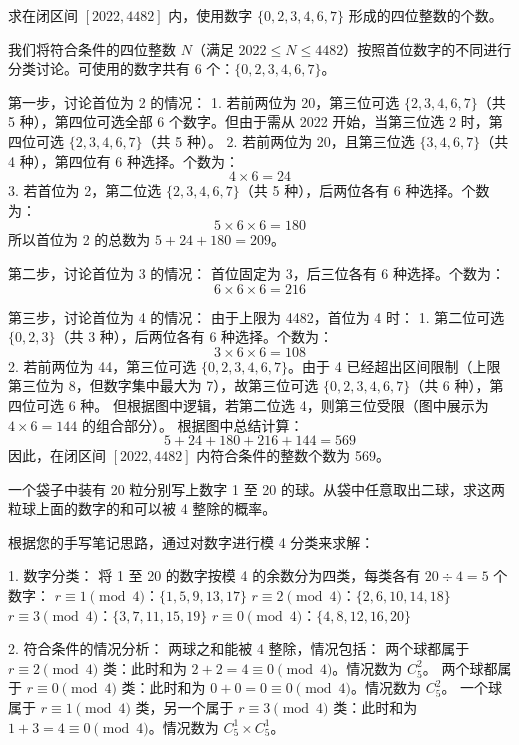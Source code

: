 \begin{questions}
    \question
求在闭区间 $[2022, 4482]$ 内，使用数字 $\{0, 2, 3, 4, 6, 7\}$ 形成的四位整数的个数。

\begin{solution}
我们将符合条件的四位整数 $N$（满足 $2022 \le N \le 4482$）按照首位数字的不同进行分类讨论。可使用的数字共有 6 个：$\{0, 2, 3, 4, 6, 7\}$。

第一步，讨论首位为 2 的情况：
1. 若前两位为 20，第三位可选 $\{2, 3, 4, 6, 7\}$（共 5 种），第四位可选全部 6 个数字。但由于需从 2022 开始，当第三位选 2 时，第四位可选 $\{2, 3, 4, 6, 7\}$（共 5 种）。
2. 若前两位为 20，且第三位选 $\{3, 4, 6, 7\}$（共 4 种），第四位有 6 种选择。个数为：
\[
4 \times 6 = 24
\]
3. 若首位为 2，第二位选 $\{2, 3, 4, 6, 7\}$（共 5 种），后两位各有 6 种选择。个数为：
\[
5 \times 6 \times 6 = 180
\]
所以首位为 2 的总数为 $5 + 24 + 180 = 209$。

第二步，讨论首位为 3 的情况：
首位固定为 3，后三位各有 6 种选择。个数为：
\[
6 \times 6 \times 6 = 216
\]

第三步，讨论首位为 4 的情况：
由于上限为 4482，首位为 4 时：
1. 第二位可选 $\{0, 2, 3\}$（共 3 种），后两位各有 6 种选择。个数为：
\[
3 \times 6 \times 6 = 108
\]
2. 若前两位为 44，第三位可选 $\{0, 2, 3, 4, 6, 7\}$。由于 4 已经超出区间限制（上限第三位为 8，但数字集中最大为 7），故第三位可选 $\{0, 2, 3, 4, 6, 7\}$（共 6 种），第四位可选 6 种。
但根据图中逻辑，若第二位选 4，则第三位受限（图中展示为 $4 \times 6 = 144$ 的组合部分）。
根据图中总结计算：
\[
5 + 24 + 180 + 216 + 144 = 569
\]
因此，在闭区间 $[2022, 4482]$ 内符合条件的整数个数为 569。
\end{solution}

\question 一个袋子中装有 20 粒分别写上数字 1 至 20 的球。从袋中任意取出二球，求这两粒球上面的数字的和可以被 4 整除的概率。

\begin{solution}
根据您的手写笔记思路，通过对数字进行模 4 分类来求解：

1. 数字分类：
   将 1 至 20 的数字按模 4 的余数分为四类，每类各有 $20 \div 4 = 5$ 个数字：
    $r \equiv 1 \pmod 4$：$\{1, 5, 9, 13, 17\}$
    $r \equiv 2 \pmod 4$：$\{2, 6, 10, 14, 18\}$
    $r \equiv 3 \pmod 4$：$\{3, 7, 11, 15, 19\}$
    $r \equiv 0 \pmod 4$：$\{4, 8, 12, 16, 20\}$

2. 符合条件的情况分析：
   两球之和能被 4 整除，情况包括：
    两个球都属于 $r \equiv 2 \pmod 4$ 类：此时和为 $2 + 2 = 4 \equiv 0 \pmod 4$。情况数为 $C_5^2$。
    两个球都属于 $r \equiv 0 \pmod 4$ 类：此时和为 $0 + 0 = 0 \equiv 0 \pmod 4$。情况数为 $C_5^2$。
    一个球属于 $r \equiv 1 \pmod 4$ 类，另一个属于 $r \equiv 3 \pmod 4$ 类：此时和为 $1 + 3 = 4 \equiv 0 \pmod 4$。情况数为 $C_5^1 \times C_5^1$。


\end{solution}
\end{questions}
